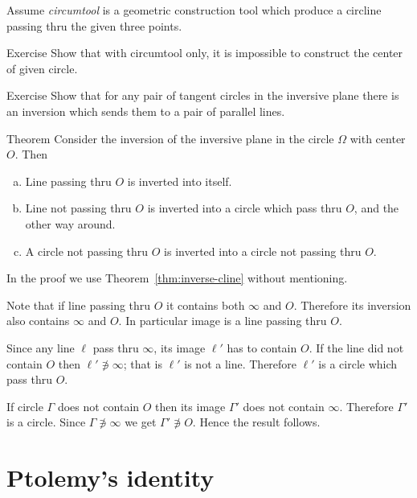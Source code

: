 Assume {}\emph{circumtool} is a geometric construction tool 
which produce a circline passing thru the given three points.



\begin{thm}{Exercise}\label{ex:circumtool}
Show that with circumtool only,
it is impossible to construct the center of given circle.
\end{thm}

\begin{thm}{Exercise}\label{ex:tangent-circ->parallels}
Show that for any pair of tangent circles in the inversive plane there is an inversion which sends them to a pair of parallel lines.
\end{thm}

\begin{thm}{Theorem}\label{thm:inverse}
Consider the inversion of the inversive plane 
in the circle $\Omega$ with center $O$. 
Then 
\begin{enumerate}[(a)]
\item\label{thm:inverse:line-line}
Line passing thru $O$ is inverted into itself.
\item\label{thm:inverse:line} 
Line not passing thru $O$ is inverted into a circle which pass thru $O$, and the other way around.
\item\label{thm:inverse:circle} 
A circle not passing thru $O$ 
is inverted into a circle not passing thru $O$. 
\end{enumerate}
\end{thm}

In the proof we use Theorem~\ref{thm:inverse-cline} without mentioning.

Note that if line passing thru $O$ it contains both $\infty$ and $O$.
Therefore its inversion also contains $\infty$ and $O$.
In particular image is a line passing thru $O$.

Since any line $\ell$ pass thru $\infty$, its image $\ell'$ has to contain $O$.
If the line did not contain $O$ then $\ell'\not\ni \infty$;
that is $\ell'$ is not a line.
Therefore $\ell'$ is a circle which pass thru $O$. 

If circle $\Gamma$ does not contain $O$ 
then its image $\Gamma'$ does not contain $\infty$.
Therefore $\Gamma'$ is a circle.
Since  $\Gamma\not\ni\infty$ we get $\Gamma' \not\ni O$.
Hence the result follows.
\qeds

\section*{Ptolemy's identity}

